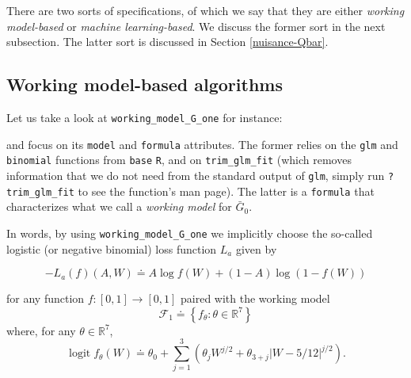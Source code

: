 \documentclass[11pt,openright,twoside]{book}
\newenvironment{Shaded}{\begin{snugshade}}{\end{snugshade}}
\newcommand{\CommentTok}[1]{\textcolor[rgb]{0.56,0.35,0.01}{\textit{#1}}}
\newcommand{\NormalTok}[1]{#1}
\DeclareMathOperator{\logit}{logit}
\newcommand{\bbR}{\mathbb{R}}
\newcommand{\defq}{\doteq}
\newcommand{\calF}{\mathcal{F}}
\newcommand{\Gbar}{\bar{G}}
\theoremstyle{definition}
\theoremstyle{definition}
\theoremstyle{definition}
\theoremstyle{remark}
\begin{document}
There are two sorts of specifications, of which we say that they are either
\emph{working model-based} or \emph{machine learning-based}. We discuss the former sort
in the next subsection. The latter sort is discussed in Section
\ref{nuisance-Qbar}.

\hypertarget{logis-loss}{%
\subsection{Working model-based algorithms}\label{logis-loss}}


Let us take a look at \texttt{working\_model\_G\_one} for instance:

\begin{Shaded}
\end{Shaded}

and focus on its \texttt{model} and \texttt{formula} attributes. The former relies on the
\texttt{glm} and \texttt{binomial} functions from \texttt{base} \texttt{R}, and on \texttt{trim\_glm\_fit} (which
removes information that we do not need from the standard output of \texttt{glm},
simply run \texttt{?trim\_glm\_fit} to see the function's man page). The latter is a
\texttt{formula} that characterizes what we call a \emph{working model} for \(\Gbar_{0}\).

In words, by using \texttt{working\_model\_G\_one} we implicitly choose the so-called
logistic (or negative binomial) loss function \(L_{a}\) given by

\begin{equation} 
\label{eq:logis-loss} -L_{a}(f)(A,W) \defq A \log f(W) + (1 - A)
\log (1 - f(W)) 
\end{equation}

for any function \(f : [0,1] \to [0,1]\) paired with the working model
\begin{equation*}   \calF_{1}   \defq    \left\{f_{\theta}   :   \theta   \in
\bbR^{7}\right\}  \end{equation*} where, for any \(\theta \in \bbR^{7}\),
\begin{equation*}\logit  f_{\theta}  (W)  \defq \theta_{0}  +  \sum_{j=1}^{3}
\left(\theta_{j} W^{j/2} + \theta_{3+j} |W - 5/12|^{j/2}\right).\end{equation*}
\end{document}
